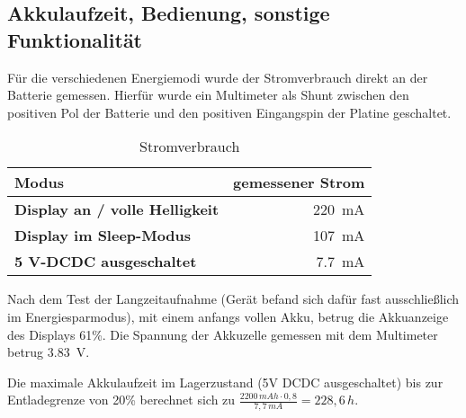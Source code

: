 \subsection{Akkulaufzeit, Bedienung, sonstige Funktionalität}

Für die verschiedenen Energiemodi wurde der Stromverbrauch direkt an der Batterie gemessen. Hierfür wurde ein Multimeter als Shunt zwischen den positiven Pol der Batterie und den positiven Eingangspin der Platine geschaltet.

\begin{table}
\center
\begin{tabular}[]{l|r}
\textbf{Modus} & \textbf{gemessener Strom} 
\\
\hline
\textbf{Display an / volle Helligkeit} & \SI{220}{\milli\ampere} 
\\
\hline
\textbf{Display im Sleep-Modus} & \SI{107}{\milli\ampere} 
\\
\hline
\textbf{5 V-DCDC ausgeschaltet} & \SI{7,7}{\milli\ampere}
\end{tabular}

\caption{Stromverbrauch}
\label{tab:Stromverbrauch}

\end{table}

Nach dem Test der Langzeitaufnahme (Gerät befand sich dafür fast ausschließlich im Energiesparmodus), mit einem anfangs vollen Akku, betrug die Akkuanzeige des Displays 61\%. Die Spannung der Akkuzelle gemessen mit dem Multimeter betrug \SI{3,83}{\volt}.

Die maximale Akkulaufzeit im Lagerzustand (5V DCDC ausgeschaltet) bis zur Entladegrenze von 20\% berechnet sich zu
$ \frac{2200\,mAh \cdot 0,8}{7,7\,mA} = 228,6\,h $.
